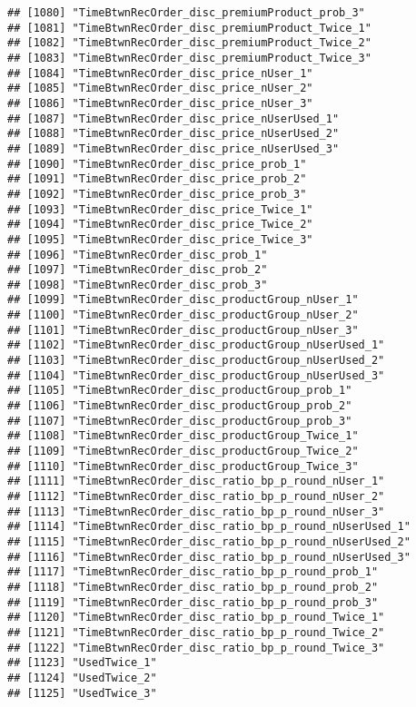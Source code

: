 \documentclass[10pt]{report}
\begin{document}
\begin{verbatim}
## [1080] "TimeBtwnRecOrder_disc_premiumProduct_prob_3"          
## [1081] "TimeBtwnRecOrder_disc_premiumProduct_Twice_1"         
## [1082] "TimeBtwnRecOrder_disc_premiumProduct_Twice_2"         
## [1083] "TimeBtwnRecOrder_disc_premiumProduct_Twice_3"         
## [1084] "TimeBtwnRecOrder_disc_price_nUser_1"                  
## [1085] "TimeBtwnRecOrder_disc_price_nUser_2"                  
## [1086] "TimeBtwnRecOrder_disc_price_nUser_3"                  
## [1087] "TimeBtwnRecOrder_disc_price_nUserUsed_1"              
## [1088] "TimeBtwnRecOrder_disc_price_nUserUsed_2"              
## [1089] "TimeBtwnRecOrder_disc_price_nUserUsed_3"              
## [1090] "TimeBtwnRecOrder_disc_price_prob_1"                   
## [1091] "TimeBtwnRecOrder_disc_price_prob_2"                   
## [1092] "TimeBtwnRecOrder_disc_price_prob_3"                   
## [1093] "TimeBtwnRecOrder_disc_price_Twice_1"                  
## [1094] "TimeBtwnRecOrder_disc_price_Twice_2"                  
## [1095] "TimeBtwnRecOrder_disc_price_Twice_3"                  
## [1096] "TimeBtwnRecOrder_disc_prob_1"                         
## [1097] "TimeBtwnRecOrder_disc_prob_2"                         
## [1098] "TimeBtwnRecOrder_disc_prob_3"                         
## [1099] "TimeBtwnRecOrder_disc_productGroup_nUser_1"           
## [1100] "TimeBtwnRecOrder_disc_productGroup_nUser_2"           
## [1101] "TimeBtwnRecOrder_disc_productGroup_nUser_3"           
## [1102] "TimeBtwnRecOrder_disc_productGroup_nUserUsed_1"       
## [1103] "TimeBtwnRecOrder_disc_productGroup_nUserUsed_2"       
## [1104] "TimeBtwnRecOrder_disc_productGroup_nUserUsed_3"       
## [1105] "TimeBtwnRecOrder_disc_productGroup_prob_1"            
## [1106] "TimeBtwnRecOrder_disc_productGroup_prob_2"            
## [1107] "TimeBtwnRecOrder_disc_productGroup_prob_3"            
## [1108] "TimeBtwnRecOrder_disc_productGroup_Twice_1"           
## [1109] "TimeBtwnRecOrder_disc_productGroup_Twice_2"           
## [1110] "TimeBtwnRecOrder_disc_productGroup_Twice_3"           
## [1111] "TimeBtwnRecOrder_disc_ratio_bp_p_round_nUser_1"       
## [1112] "TimeBtwnRecOrder_disc_ratio_bp_p_round_nUser_2"       
## [1113] "TimeBtwnRecOrder_disc_ratio_bp_p_round_nUser_3"       
## [1114] "TimeBtwnRecOrder_disc_ratio_bp_p_round_nUserUsed_1"   
## [1115] "TimeBtwnRecOrder_disc_ratio_bp_p_round_nUserUsed_2"   
## [1116] "TimeBtwnRecOrder_disc_ratio_bp_p_round_nUserUsed_3"   
## [1117] "TimeBtwnRecOrder_disc_ratio_bp_p_round_prob_1"        
## [1118] "TimeBtwnRecOrder_disc_ratio_bp_p_round_prob_2"        
## [1119] "TimeBtwnRecOrder_disc_ratio_bp_p_round_prob_3"        
## [1120] "TimeBtwnRecOrder_disc_ratio_bp_p_round_Twice_1"       
## [1121] "TimeBtwnRecOrder_disc_ratio_bp_p_round_Twice_2"       
## [1122] "TimeBtwnRecOrder_disc_ratio_bp_p_round_Twice_3"       
## [1123] "UsedTwice_1"                                          
## [1124] "UsedTwice_2"                                          
## [1125] "UsedTwice_3"
\end{verbatim}
\end{document}
